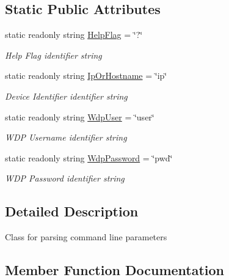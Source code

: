 \subsection*{Static Public Attributes}
\begin{DoxyCompactItemize}
\item 
static readonly string \hyperlink{class_mock_data_generator_1_1_parameter_helper_abf714b4e3c94b56cbd994db316c92d23}{Help\+Flag} = \char`\"{}?\char`\"{}
\begin{DoxyCompactList}\small\item\em Help Flag identifier string \end{DoxyCompactList}\item 
static readonly string \hyperlink{class_mock_data_generator_1_1_parameter_helper_a6258a253b06b4aef1a678372f6c035fa}{Ip\+Or\+Hostname} = \char`\"{}ip\char`\"{}
\begin{DoxyCompactList}\small\item\em Device Identifier identifier string \end{DoxyCompactList}\item 
static readonly string \hyperlink{class_mock_data_generator_1_1_parameter_helper_ad1fd80b7aebc61379fdec5cfa1164621}{Wdp\+User} = \char`\"{}user\char`\"{}
\begin{DoxyCompactList}\small\item\em W\+DP Username identifier string \end{DoxyCompactList}\item 
static readonly string \hyperlink{class_mock_data_generator_1_1_parameter_helper_ac751eeb8296390769e03caa6c44e3dba}{Wdp\+Password} = \char`\"{}pwd\char`\"{}
\begin{DoxyCompactList}\small\item\em W\+DP Password identifier string \end{DoxyCompactList}\end{DoxyCompactItemize}


\subsection{Detailed Description}
Class for parsing command line parameters 



\subsection{Member Function Documentation}
